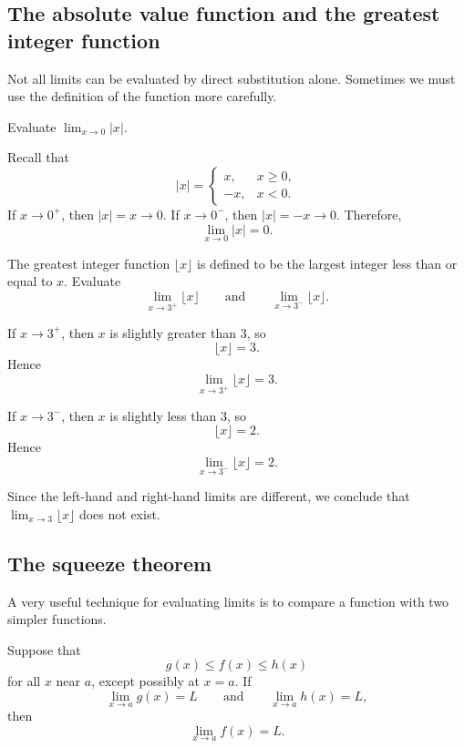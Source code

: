 \subsection{The absolute value function and the greatest integer function}

Not all limits can be evaluated by direct substitution alone. Sometimes we must use the definition of the function more carefully.

\begin{example}
Evaluate
\(\displaystyle
\lim_{x\to 0}|x|.
\)
\end{example}

\begin{solution}
Recall that
\[
|x|=
\begin{cases}
x, & x\ge 0,\\[4pt]
-x, & x<0.
\end{cases}
\]
If \(x\to 0^{+}\), then \(|x|=x\to 0\). If \(x\to 0^{-}\), then \(|x|=-x\to 0\). Therefore,
\[
\lim_{x\to 0}|x|=0.
\]
\end{solution}

\begin{example}
The greatest integer function \(\lfloor x \rfloor\) is defined to be the largest integer less than or equal to \(x\). Evaluate
\[
\lim_{x\to 3^{+}}\lfloor x \rfloor
\qquad \text{and} \qquad
\lim_{x\to 3^{-}}\lfloor x \rfloor.
\]
\end{example}

\begin{solution}
If \(x\to 3^{+}\), then \(x\) is slightly greater than \(3\), so
\[
\lfloor x \rfloor=3.
\]
Hence
\[
\lim_{x\to 3^{+}}\lfloor x \rfloor=3.
\]

If \(x\to 3^{-}\), then \(x\) is slightly less than \(3\), so
\[
\lfloor x \rfloor=2.
\]
Hence
\[
\lim_{x\to 3^{-}}\lfloor x \rfloor=2.
\]

Since the left-hand and right-hand limits are different, we conclude that
\(\displaystyle
\lim_{x\to 3}\lfloor x \rfloor
\)
does not exist.
\end{solution}

\subsection{The squeeze theorem}

A very useful technique for evaluating limits is to compare a function with two simpler functions.

\begin{theorem}
Suppose that
\[
g(x)\le f(x)\le h(x)
\]
for all \(x\) near \(a\), except possibly at \(x=a\). If
\[
\lim_{x\to a}g(x)=L
\qquad \text{and} \qquad
\lim_{x\to a}h(x)=L,
\]
then
\[
\lim_{x\to a}f(x)=L.
\]
\end{theorem}

